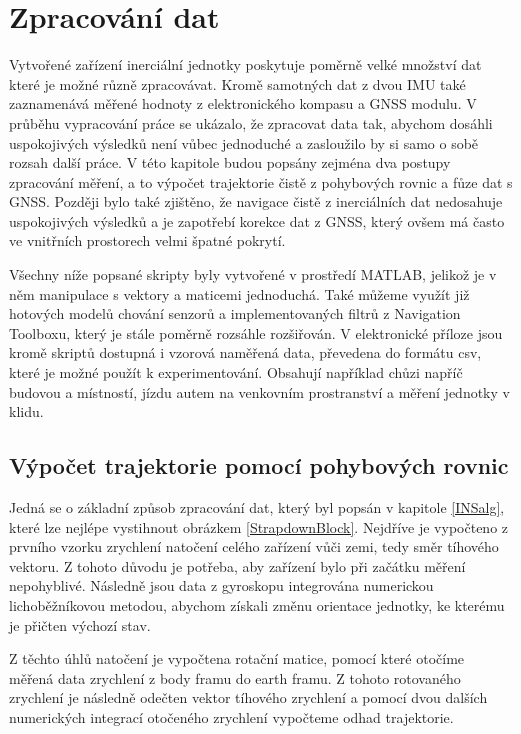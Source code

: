 \chapter{Zpracování dat}
Vytvořené zařízení inerciální jednotky poskytuje poměrně velké množství dat které je možné různě zpracovávat. Kromě samotných dat z dvou IMU také zaznamenává měřené hodnoty z elektronického kompasu a GNSS modulu. V průběhu vypracování práce se ukázalo, že zpracovat data tak, abychom dosáhli uspokojivých výsledků není vůbec jednoduché a zasloužilo by si samo o sobě rozsah další práce. V této kapitole budou popsány zejména dva postupy zpracování měření, a to výpočet trajektorie čistě z pohybových rovnic a fůze dat s GNSS. Později bylo také zjištěno, že navigace čistě z inerciálních dat nedosahuje uspokojivých výsledků a je zapotřebí korekce dat z GNSS, který ovšem má často ve vnitřních prostorech velmi špatné pokrytí.

Všechny níže popsané skripty byly vytvořené v prostředí MATLAB, jelikož je v něm manipulace s vektory a maticemi jednoduchá. Také můžeme využít již hotových modelů chování senzorů a implementovaných filtrů z Navigation Toolboxu, který je stále poměrně rozsáhle rozšiřován. V elektronické příloze jsou kromě skriptů dostupná i vzorová naměřená data, převedena do formátu csv, které je možné použít k experimentování. Obsahují například chůzi napříč budovou a místností, jízdu autem na venkovním prostranství a měření jednotky v klidu.

\section{Výpočet trajektorie pomocí pohybových rovnic} \label{noFiltProcessing}
Jedná se o základní způsob zpracování dat, který byl popsán v kapitole \ref{INSalg}, které lze nejlépe vystihnout obrázkem  \ref{StrapdownBlock}. Nejdříve je vypočteno z prvního vzorku zrychlení natočení celého zařízení vůči zemi, tedy směr tíhového vektoru. Z tohoto důvodu je potřeba, aby zařízení bylo při začátku měření nepohyblivé. Následně jsou data z gyroskopu integrována numerickou lichoběžníkovou metodou, abychom získali změnu orientace jednotky, ke kterému je přičten výchozí stav.

Z těchto úhlů natočení je vypočtena rotační matice, pomocí které otočíme měřená data zrychlení z body framu do earth framu. Z tohoto rotovaného zrychlení je následně odečten vektor tíhového zrychlení a pomocí dvou dalších numerických integrací otočeného zrychlení vypočteme odhad trajektorie.

